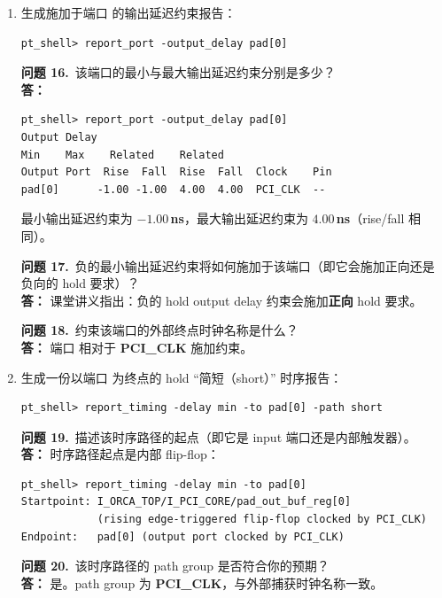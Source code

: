 \begin{enumerate}
  \item 生成施加于端口  的输出延迟约束报告：
\begin{lstlisting}
pt_shell> report_port -output_delay pad[0]
\end{lstlisting}

\begin{questionBox}
\textbf{问题 16.}\ 该端口的最小与最大输出延迟约束分别是多少？\\[0.35em]
\textbf{答：}\\
\begin{lstlisting}
pt_shell> report_port -output_delay pad[0]
Output Delay
Min    Max    Related    Related
Output Port  Rise  Fall  Rise  Fall  Clock    Pin
pad[0]      -1.00 -1.00  4.00  4.00  PCI_CLK  --
\end{lstlisting}
最小输出延迟约束为 \textbf{$-1.00$\,ns}，最大输出延迟约束为 \textbf{$4.00$\,ns}（rise/fall 相同）。

\textbf{问题 17.}\ 负的最小输出延迟约束将如何施加于该端口（即它会施加正向还是负向的 hold 要求）？\\[0.35em]
\textbf{答：} 课堂讲义指出：负的 hold output delay 约束会施加\textbf{正向} hold 要求。

\textbf{问题 18.}\ 约束该端口的外部终点时钟名称是什么？\\[0.35em]
\textbf{答：} 端口  相对于 \textbf{PCI\_CLK} 施加约束。
\end{questionBox}

  \item 生成一份以端口  为终点的 hold ``简短（short）'' 时序报告：
\begin{lstlisting}
pt_shell> report_timing -delay min -to pad[0] -path short
\end{lstlisting}

\begin{questionBox}
\textbf{问题 19.}\ 描述该时序路径的起点（即它是 input 端口还是内部触发器）。\\[0.35em]
\textbf{答：} 时序路径起点是内部 flip-flop：
\begin{lstlisting}
pt_shell> report_timing -delay min -to pad[0]
Startpoint: I_ORCA_TOP/I_PCI_CORE/pad_out_buf_reg[0]
            (rising edge-triggered flip-flop clocked by PCI_CLK)
Endpoint:   pad[0] (output port clocked by PCI_CLK)
\end{lstlisting}

\textbf{问题 20.}\ 该时序路径的 path group 是否符合你的预期？\\[0.35em]
\textbf{答：} 是。path group 为 \textbf{PCI\_CLK}，与外部捕获时钟名称一致。


\end{questionBox}
\end{enumerate}
